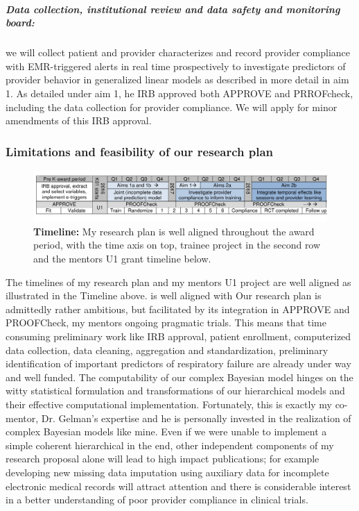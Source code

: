 \documentclass[11pt,notitlepage]{article}
\begin{document}
\subparagraph*{Data collection, institutional review and data safety and monitoring board:} we will collect patient and provider characterizes and record provider compliance with EMR-triggered alerts in real time prospectively to investigate predictors of provider behavior in generalized linear models as described in more detail in aim 1. As detailed under aim 1, he IRB approved both APPROVE and PRROFcheck, including the data collection for provider compliance. We will apply for minor amendments of this IRB approval.
 
\subsubsection*{Limitations and feasibility of our research plan }

\begin{figure}[h]
 \vspace{-20pt}
 \centering
   \includegraphics[scale=1]{Figures/Timeline.pdf}  
 \vspace{-30pt}
 \caption*{\footnotesize \textbf{Timeline:} My research plan is well aligned throughout the award period, with the time axis on top, trainee project in the second row and the mentors U1 grant timeline below. }
  \vspace{-10pt}
  \label{fig:Timeline}
 \end{figure}
 
The timelines of my research plan and my mentors U1 project are well aligned as illustrated in the Timeline above. is well aligned with Our research plan is admittedly rather ambitious, but facilitated by its integration in APPROVE and PROOFCheck, my mentors ongoing pragmatic trials. This means that time consuming preliminary work like IRB approval, patient enrollment, computerized data collection, data cleaning, aggregation and standardization, preliminary identification of important predictors of respiratory failure are already under way and well funded. The computability of our complex Bayesian model hinges on the witty statistical formulation and transformations of our hierarchical models and their effective computational implementation. Fortunately, this is exactly my co-mentor, Dr. Gelman's expertise and he is personally invested in the realization of complex Bayesian models like mine. Even if we were unable to implement a simple coherent hierarchical in the end, other independent components of my research proposal alone will lead to high impact publications; for example developing new missing data imputation using auxiliary data for incomplete electronic medical records will attract attention and there is considerable interest in a better understanding of poor provider compliance in clinical trials. 
\end{document}
